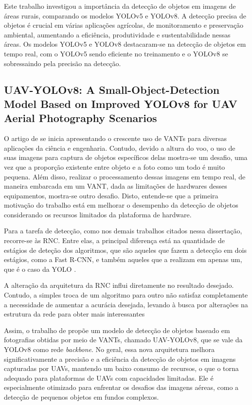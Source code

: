Este trabalho investigou a importância da detecção de objetos em imagens de áreas rurais, comparando os modelos YOLOv5 e YOLOv8. A detecção precisa de objetos é crucial em várias aplicações agrícolas, de monitoramento e preservação ambiental, aumentando a eficiência, produtividade e sustentabilidade nessas áreas. Os modelos YOLOv5 e YOLOv8 destacaram-se na detecção de objetos em tempo real, com o YOLOv5 sendo eficiente no treinamento e o YOLOv8 se sobressaindo pela precisão na detecção.


\subsection{UAV-YOLOv8: A Small-Object-Detection Model Based on Improved YOLOv8 for UAV Aerial Photography Scenarios}

O artigo de  se inicia apresentando o crescente uso de VANTs para diversas aplicações da ciência e engenharia. Contudo, devido a altura do voo, o uso de suas imagens para captura de objetos específicos delas mostra-se um desafio, uma vez que a proporção existente entre objeto e a foto como um todo é muito pequena. Além disso, realizar o processamento dessas imagens em tempo real, de maneira embarcada em um VANT, dada as limitações de hardwares desses equipamentos, mostra-se outro desafio. Disto, entende-se que a primeira motivação do trabalho está em melhorar o desempenho da detecção de objetos considerando os recursos limitados da plataforma de hardware.

Para a tarefa de detecção, como nos demais trabalhos citados nessa dissertação, recorre-se às RNC. Entre elas, a principal diferença está na quantidade de estágios de deteção dos algoritmos, que são aqueles que fazem a detecção em dois estágios, como a Fast R-CNN, e também aqueles que a realizam em apenas um, que é o caso da YOLO \cite{girshick2015fast}.

A alteração da arquitetura da RNC influi diretamente no resultado desejado. Contudo, a simples troca de um algoritmo para outro não satisfaz completamente a necessidade de aumentar a acurácia desejada, levando à busca por alterações na estrutura da rede para obter mais interessantes

Assim, o trabalho de  propõe um modelo de detecção de objetos baseado em fotografias obtidas por meio de VANTs, chamado UAV-YOLOv8, que se vale da  YOLOv8 como rede \textit{backbone}. No geral, essa nova arquitetura melhora significativamente a precisão e a eficiência da detecção de objetos em imagens capturadas por UAVs, mantendo um baixo consumo de recursos, o que o torna adequado para plataformas de UAVs com capacidades limitadas. Ele é especialmente otimizado para enfrentar os desafios das imagens aéreas, como a detecção de pequenos objetos em fundos complexos.

